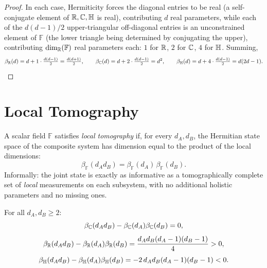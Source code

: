 \begin{proof}
In each case, Hermiticity forces the diagonal entries to be real (a
self-conjugate element of $\mathbb{R},\mathbb{C},\mathbb{H}$ is real), contributing $d$ real
parameters, while each of the $d(d-1)/2$ upper-triangular off-diagonal entries
is an unconstrained element of $\mathbb F$ (the lower triangle being
determined by conjugating the upper), contributing $\dim_{\mathbb{R}}(\mathbb F)$ real
parameters each: $1$ for $\mathbb{R}$, $2$ for $\mathbb{C}$, $4$ for $\mathbb{H}$. Summing,
\begin{equation}
\beta_{\mathbb{R}}(d) = d + 1\cdot\tfrac{d(d-1)}{2} = \tfrac{d(d+1)}{2}, \qquad
\beta_{\mathbb{C}}(d) = d + 2\cdot\tfrac{d(d-1)}{2} = d^2, \qquad
\beta_{\mathbb{H}}(d) = d + 4\cdot\tfrac{d(d-1)}{2} = d(2d-1).
\end{equation}
\end{proof}

\section{Local Tomography}

\begin{definition}
A scalar field $\mathbb F$ satisfies \emph{local tomography} if, for every
$d_A,d_B$, the Hermitian state space of the composite system has dimension
equal to the product of the local dimensions:
\begin{equation}
\beta_{\mathbb F}(d_A d_B) = \beta_{\mathbb F}(d_A)\, \beta_{\mathbb F}(d_B).
\end{equation}
Informally: the joint state is exactly as informative as a tomographically
complete set of \emph{local} measurements on each subsystem, with no
additional holistic parameters and no missing ones.
\end{definition}

\begin{theorem}
\label{thm:local-tomography}
For all $d_A,d_B \ge 2$:
\begin{equation}
\beta_{\mathbb{C}}(d_Ad_B) - \beta_{\mathbb{C}}(d_A)\beta_{\mathbb{C}}(d_B) = 0,
\end{equation}
\begin{equation}
\beta_{\mathbb{R}}(d_Ad_B) - \beta_{\mathbb{R}}(d_A)\beta_{\mathbb{R}}(d_B) = \frac{d_Ad_B(d_A-1)(d_B-1)}{4} > 0,
\end{equation}
\begin{equation}
\beta_{\mathbb{H}}(d_Ad_B) - \beta_{\mathbb{H}}(d_A)\beta_{\mathbb{H}}(d_B) = -2\,d_Ad_B(d_A-1)(d_B-1) < 0.
\end{equation}
\end{theorem}

